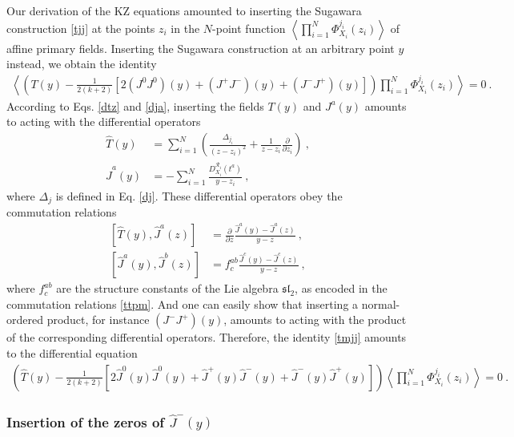 \documentclass[12pt, a4paper, notitlepage, twoside]{report}
\numberwithin{equation}{section}
\theoremstyle{break}
\begin{document}
Our derivation of the KZ equations amounted to inserting the Sugawara construction \eqref{tjj}  at the points $z_i$ in the $N$-point function $\left\langle \prod_{i=1}^N \Phi^{j_i}_{X_i}(z_i)\right\rangle $ of affine primary fields.
Inserting the Sugawara construction at an arbitrary point $y$ instead, we obtain the identity
\begin{align}
 \left\langle \left(T(y)  - \frac{1}{2(k+2)}\left[ 2(J^0J^0)(y)+(J^+J^-)(y)+(J^-J^+)(y)\right]\right) \prod_{i=1}^N \Phi^{j_i}_{X_i}(z_i)\right\rangle = 0\ .
\label{tmjj}
\end{align}
According to Eqs. \eqref{dtz} and \eqref{dja}, inserting the fields $T(y)$ and $J^a(y)$ amounts to acting with the differential operators 
\begin{align}
 \hat{T}(y) &= \sum_{i=1}^N \left(\frac{\Delta_{j_i}}{(z-z_i)^2} + \frac{1}{z-z_i}{\frac{\partial}{\partial z_i}}\right)\ ,
\label{tcy}
\\
 \hat{J}^a(y) &= - \sum_{i=1}^N \frac{D^{\mathcal{R}_i}_{X_i}(t^a)}{y-z_i}\ ,
\label{jay}
\end{align}
where $\Delta_j$ is defined in Eq. \eqref{dj}.
These differential operators obey the commutation relations
\begin{align}
 \left[\hat{T}(y),\hat{J}^a(z)\right] &= {\frac{\partial}{\partial z}} \frac{\hat{J}^a(y)-\hat{J}^a(z)}{y-z}\ ,
\label{dtd}
\\
 \left[ \hat{J}^a(y),\hat{J}^b(z)\right] &= f^{ab}_c \frac{\hat{J}^c(y)-\hat{J}^c(z)}{y-z}\ ,
\label{ddd}
\end{align}
where $f^{ab}_c$ are the structure constants of the Lie algebra $\mathfrak{sl}_2$, as encoded in the commutation relations \eqref{ttpm}.
And one can easily show that inserting a normal-ordered product, for instance $(J^-J^+)(y)$, amounts to acting with the product of the corresponding differential operators.
Therefore, the identity \eqref{tmjj} amounts to the differential equation
\begin{align}
 \left(\hat{T}(y) -\frac{1}{2(k+2)}\left[ 2\hat{J}^0(y)\hat{J}^0(y) +\hat{J}^+(y)\hat{J}^-(y)+\hat{J}^-(y)\hat{J}^+(y)\right]\right) \left\langle \prod_{i=1}^N \Phi^{j_i}_{X_i}(z_i)\right\rangle=0\ .
 \label{refkz}
\end{align}

\subsubsection{Insertion of the zeros of $\hat{J}^-(y)$}
\end{document}
